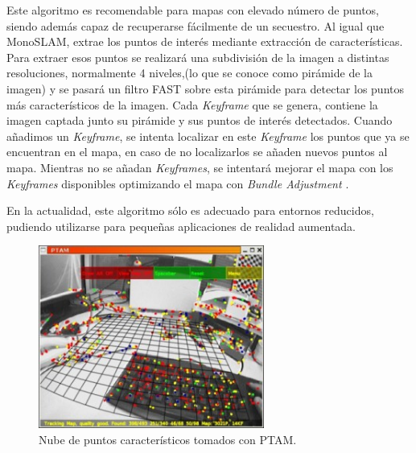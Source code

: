 Este algoritmo es recomendable para mapas con elevado número de puntos, siendo además capaz de recuperarse fácilmente de un secuestro. Al igual que MonoSLAM, extrae los puntos de interés mediante extracción de características. Para extraer esos puntos se realizará una subdivisión de la imagen a distintas resoluciones, normalmente 4 niveles,(lo que se conoce como pirámide de la imagen) y se pasará un filtro FAST sobre esta pirámide para detectar los puntos más característicos de la imagen.
Cada \textit{Keyframe} que se genera, contiene  la imagen captada junto su pirámide y sus puntos de interés detectados. Cuando añadimos un \textit{Keyframe}, se intenta localizar en este \textit{Keyframe} los puntos que ya se encuentran en el mapa, en caso de no localizarlos se añaden nuevos puntos al mapa. Mientras no se añadan \textit{Keyframes}, se intentará mejorar el mapa con los \textit{Keyframes} disponibles optimizando el mapa con \textit{Bundle Adjustment \cite{BundleAdjust08}}.

En la actualidad, este algoritmo sólo es adecuado para entornos reducidos, pudiendo utilizarse para pequeñas aplicaciones de realidad aumentada.

\begin{figure}[H]
\begin{center}
\includegraphics[height=6.0cm]{img/cap4/ptam_screenshot-300x243.jpg}
\end{center}
\caption{Nube de puntos característicos tomados con PTAM.}
\end{figure}



\clearpage


